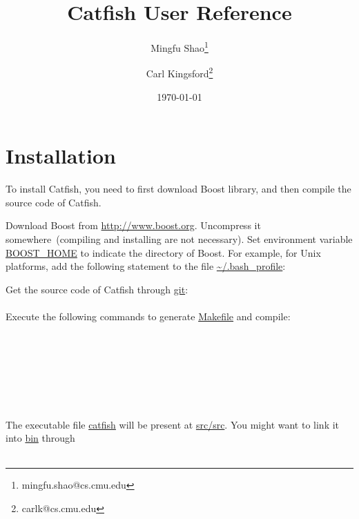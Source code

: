 \documentclass[letter,11pt]{article}
\title{Catfish User Reference}
\author{Mingfu Shao\thanks{mingfu.shao@cs.cmu.edu}}
\author{Carl Kingsford\thanks{carlk@cs.cmu.edu}}
\affil{Computational Biology Department, School of Computer Science, Carnegie Mellon University}
\date{\today}
\begin{document}
\maketitle

\section{Installation}
To install Catfish, you need to first download Boost library, and then compile the source code of Catfish.

Download Boost from \url{http://www.boost.org}. Uncompress it
somewhere~(compiling and installing are not necessary). Set environment
variable \url{BOOST_HOME} to indicate the directory of Boost.
For example, for Unix platforms, add the following
statement to the file \url{~/.bash_profile}:\\

Get the source code of Catfish through \url{git}:\\
\\
Execute the following commands to generate \url{Makefile} and compile:\\
\\
\\
\\
\\
\\
\\
\\
The executable file \url{catfish} will be present at \url{src/src}.
You might want to link it into \url{bin} through\\
\\
\end{document}

